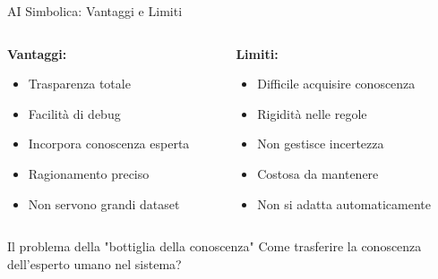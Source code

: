 \documentclass[aspectratio=169,12pt]{beamer}
\begin{document}
%
%
\begin{frame}{AI Simbolica: Vantaggi e Limiti}
    \begin{columns}
        \begin{column}{0.5\textwidth}
            \textbf{Vantaggi:}
            \begin{itemize}
                \item Trasparenza totale
                \item Facilità di debug
                \item Incorpora conoscenza esperta
                \item Ragionamento preciso
                \item Non servono grandi dataset
            \end{itemize}
        \end{column}
        \begin{column}{0.5\textwidth}
            \textbf{Limiti:}
            \begin{itemize}
                \item Difficile acquisire conoscenza
                \item Rigidità nelle regole
                \item Non gestisce incertezza
                \item Costosa da mantenere
                \item Non si adatta automaticamente
            \end{itemize}
        \end{column}
    \end{columns}
    
    \vspace{0.5cm}
    
    \begin{alertblock}{Il problema della "bottiglia della conoscenza"}
        Come trasferire la conoscenza dell'esperto umano nel sistema?
    \end{alertblock}
\end{frame}
%
%
\end{document}
